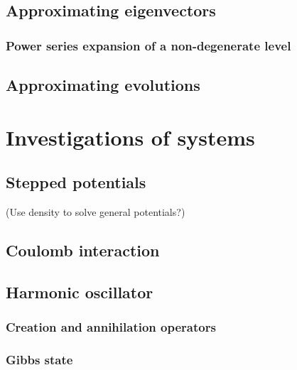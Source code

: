 \section{Approximating eigenvectors}
\subsection{Power series expansion of a non-degenerate level}

\section{Approximating evolutions}

\chapter{Investigations of systems}
\section{Stepped potentials}
(Use density to solve general potentials?)
\section{Coulomb interaction}
\section{Harmonic oscillator}
\subsection{Creation and annihilation operators}

\begin{lemma}

\end{lemma}

\subsection{Gibbs state}

